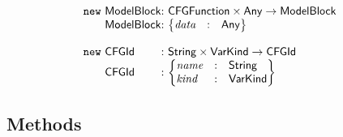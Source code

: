 \[\begin{array}{@{~}r@{~}l@{}l@{~}l}
\new & \ModelBlock & : & \CFGFunction \times \Any \rightarrow \ModelBlock\\
& \ModelBlock & : &
\begin{Bmatrix*}[l]
\emph{data} & : & \Any \\
\end{Bmatrix*}\\
&&& \\

\new & \CFGId & : & \String \times \VarKind \rightarrow \CFGId\\
& \CFGId & : &
\begin{Bmatrix*}[l]
\emph{name} & : & \String\\
\emph{kind} & : & \VarKind\\
\end{Bmatrix*}\\
\end{array}
\]

\subsection{Methods}
